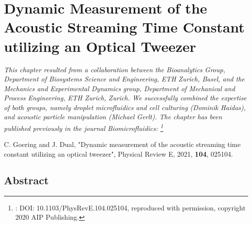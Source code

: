 \renewcommand{\relPath}{SECTION/30_Timeconstant}
 
\chapter[Dynamic Timeconstant Measurement]{Dynamic Measurement of the Acoustic 
Streaming Time Constant utilizing an Optical Tweezer}\label{ch:timeconstatn}
\textit{This chapter resulted from a collaboration between the Bioanalytics 
  Group, Department of Biosystems Science and Engineering, ETH Zurich, Basel, 
  and the Mechanics and Experimental Dynamics group, Department of Mechanical 
  and Process Engineering, ETH Zurich, Zurich. We successfully combined the 
  expertise of both groups, namely droplet microfluidics and cell culturing 
  (Dominik Haidas), and acoustic particle manipulation (Michael Gerlt). The 
  chapter has been published previously in the journal Biomicrofluidics:
\footnote{: DOI: 10.1103/PhysRevE.104.025104, reproduced with permission, 
copyright 2020 AIP Publishing.}}

\vspace{5mm} \noindent
C. Goering and J. Dual, "Dynamic measurement of the acoustic streaming time 
constant utilizing an optical tweezer", Physical Review E, 2021, \textbf{104}, 
025104.


\section{Abstract}







